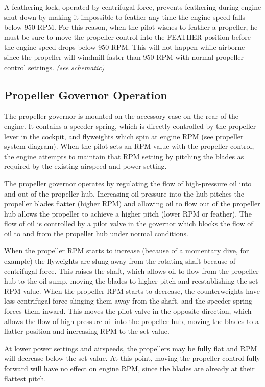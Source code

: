 A feathering lock, operated by centrifugal force, prevents feathering during engine shut down by making it
impossible to feather any time the engine speed falls below 950 RPM. For this reason, when the pilot wishes to
feather a propeller, he must be sure to move the propeller control into the FEATHER position before the engine
speed drops below 950 RPM. This will not happen while airborne since the propeller will windmill faster than 950
RPM with normal propeller control settings. \emph{(see schematic)}

\subsection{Propeller Governor Operation}

The propeller governor is mounted on the accessory case on the rear of the engine. It contains a speeder spring,
which is directly controlled by the propeller lever in the cockpit, and flyweights which spin at engine RPM (see
propeller system diagram). When the pilot sets an RPM value with the propeller control, the engine attempts to
maintain that RPM setting by pitching the blades as required by the existing airspeed and power setting.

The propeller governor operates by regulating the flow of high-pressure oil into and out of the propeller hub.
Increasing oil pressure into the hub pitches the propeller blades flatter (higher RPM) and allowing oil to flow out of
the propeller hub allows the propeller to achieve a higher pitch (lower RPM or feather). The flow of oil is controlled
by a pilot valve in the governor which blocks the flow of oil to and from the propeller hub under normal conditions.

When the propeller RPM starts to increase (because of a momentary dive, for example) the flyweights are slung
away from the rotating shaft because of centrifugal force. This raises the shaft, which allows oil to flow from the
propeller hub to the oil sump, moving the blades to higher pitch and reestablishing the set RPM value. When the
propeller RPM starts to decrease, the counterweights have less centrifugal force slinging them away from the shaft,
and the speeder spring forces them inward. This moves the pilot valve in the opposite direction, which allows the
flow of high-pressure oil into the propeller hub, moving the blades to a flatter position and increasing RPM to the set
value.

At lower power settings and airspeeds, the propellers may be fully flat and RPM will decrease below the set value.
At this point, moving the propeller control fully forward will have no effect on engine RPM, since the blades are
already at their flattest pitch.


